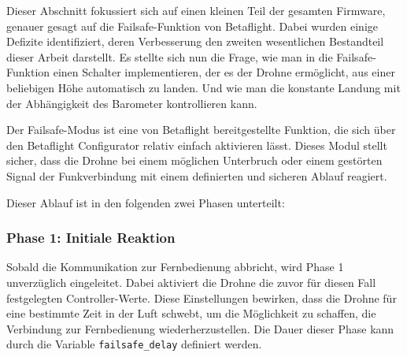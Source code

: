Dieser Abschnitt fokussiert sich auf einen kleinen Teil der gesamten Firmware, genauer gesagt auf die Failsafe-Funktion von Betaflight. Dabei wurden einige Defizite identifiziert, deren Verbesserung den zweiten wesentlichen Bestandteil dieser Arbeit darstellt. Es stellte sich nun die Frage, wie man in die Failsafe-Funktion einen Schalter implementieren, der es der Drohne ermöglicht, aus einer beliebigen Höhe automatisch zu landen. Und wie man die konstante Landung mit der Abhängigkeit des Barometer kontrollieren kann.


Der Failsafe-Modus ist eine von Betaflight bereitgestellte Funktion, die sich über den Betaflight Configurator relativ einfach aktivieren lässt. Dieses Modul stellt sicher, dass die Drohne bei einem möglichen Unterbruch oder einem gestörten Signal der Funkverbindung mit einem definierten und sicheren Ablauf reagiert.

Dieser Ablauf ist in den folgenden zwei Phasen unterteilt:

\subsubsection{Phase 1: Initiale Reaktion}
Sobald die Kommunikation zur Fernbedienung abbricht, wird Phase 1 unverzüglich eingeleitet. Dabei aktiviert die Drohne die zuvor für diesen Fall festgelegten Controller-Werte. Diese Einstellungen bewirken, dass die Drohne für eine bestimmte Zeit in der Luft schwebt, um die Möglichkeit zu schaffen, die Verbindung zur Fernbedienung wiederherzustellen. Die Dauer dieser Phase kann durch die Variable \texttt{failsafe\_delay} definiert werden.

